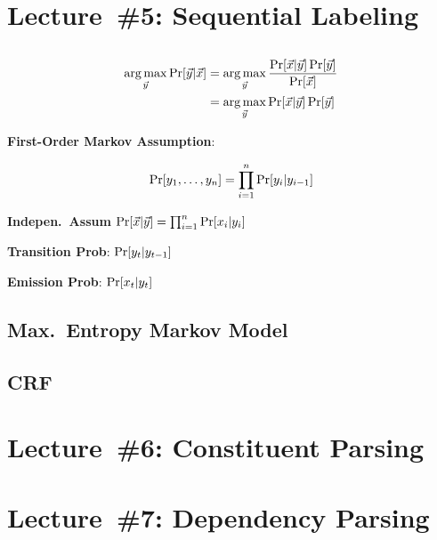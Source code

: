 \documentclass[9pt]{extarticle}
\renewcommand{\green}[1]{{\color{ForestGreen} #1}}
\begin{document}
\begin{multicols}{3}
  \section*{Lecture~\#5: Sequential Labeling}
  \subsection*{}

  \begin{align*}
    \operatorname*{arg\,max}_{\vec{y}} \Pr\lbrack\vec{y} \vert \vec{x}\rbrack &= \operatorname*{arg\,max}_{\vec{y}} \frac{\Pr\lbrack\vec{x} \vert \vec{y}\rbrack\Pr[\vec{y}]}{\Pr[\vec{x}]} \\
                                                        &= \operatorname*{arg\,max}_{\vec{y}} \Pr\lbrack\vec{x} \vert \vec{y}\rbrack \Pr[\vec{y}]
  \end{align*}

  \textbf{\green{First-Order Markov Assumption}}:

  \begin{equation*}
    \Pr\lbrack y_{1},\ldots,y_{n}\rbrack = \prod_{i=1}^{n} \Pr[y_{i} \vert y_{i-1}]
  \end{equation*}

  \textbf{\green{Indepen.\ Assum}} $\Pr\lbrack\vec{x} \vert \vec{y}\rbrack = \prod_{i=1}^{n} \Pr[x_{i} \vert y_{i}]$

  \textbf{\green{Transition Prob}}: $\Pr\lbrack y_{t} \vert y_{t-1}\rbrack$

  \textbf{\green{Emission Prob}}: $\Pr\lbrack x_{t} \vert y_{t}\rbrack$

  \subsection*{Max.\ Entropy Markov Model}
  \subsection*{CRF}
  \section*{Lecture~\#6: Constituent Parsing}
  \section*{Lecture~\#7: Dependency Parsing}

\end{multicols}
\end{document}
